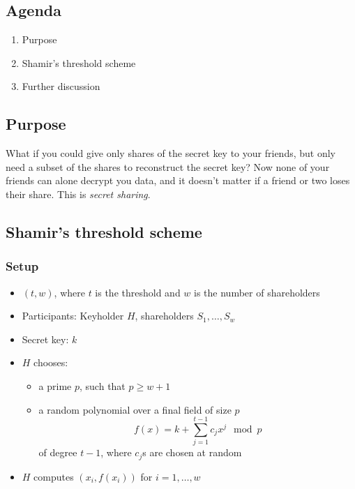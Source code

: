 

\subsection*{Agenda}
\begin{enumerate}
\item Purpose
\item Shamir's threshold scheme
\item Further discussion
\end{enumerate}

\subsection{Purpose}
What if you could give  only shares of the secret key to your
friends, but only need a subset of the shares to reconstruct the
secret key? Now none of your friends can alone decrypt you data, and
it doesn't matter if a friend or two loses their share. This is
\emph{secret sharing}.

\subsection{Shamir's threshold scheme}
\subsubsection*{Setup}
\begin{itemize}
\item $(t, w)$, where $t$ is the threshold and $w$ is the number of shareholders
\item Participants: Keyholder $H$, shareholders $S_1, \ldots, S_w$
\item Secret key: $k$
\item $H$ chooses:
  \begin{itemize}
  \item a prime $p$, such that $p \ge w + 1$
  \item a random polynomial over a final field of size $p$
    \[ f(x) = k + \sum\limits_{j=1}^{t-1} c_jx^j \mod p \]
    of degree $t-1$, where $c_j$s are chosen at random
  \end{itemize}
\item $H$ computes $(x_i, f(x_i))$ for $i  = 1, \ldots, w$
\end{itemize}

